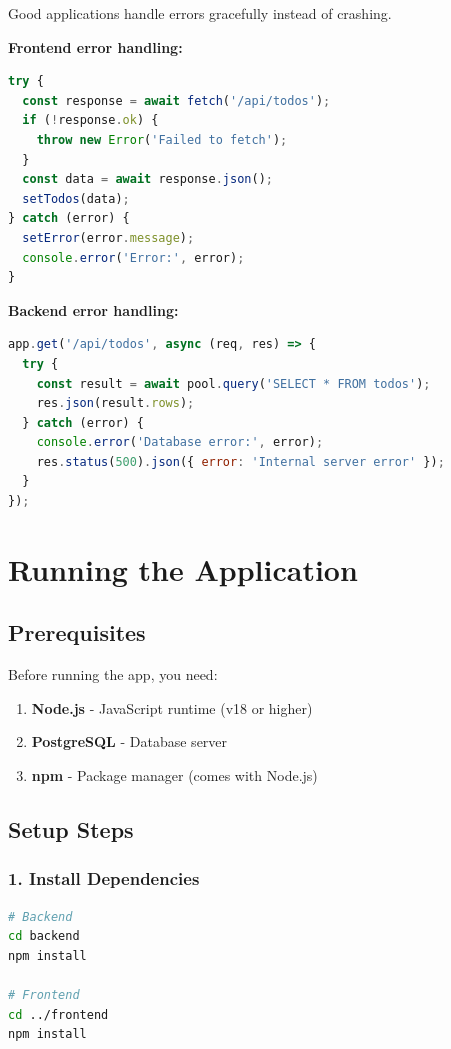 \documentclass[12pt,a4paper]{article}
\begin{document}
Good applications handle errors gracefully instead of crashing.

\textbf{Frontend error handling:}
\begin{lstlisting}[language=JavaScript]
try {
  const response = await fetch('/api/todos');
  if (!response.ok) {
    throw new Error('Failed to fetch');
  }
  const data = await response.json();
  setTodos(data);
} catch (error) {
  setError(error.message);
  console.error('Error:', error);
}
\end{lstlisting}

\textbf{Backend error handling:}
\begin{lstlisting}[language=JavaScript]
app.get('/api/todos', async (req, res) => {
  try {
    const result = await pool.query('SELECT * FROM todos');
    res.json(result.rows);
  } catch (error) {
    console.error('Database error:', error);
    res.status(500).json({ error: 'Internal server error' });
  }
});
\end{lstlisting}

\section{Running the Application}

\subsection{Prerequisites}

Before running the app, you need:
\begin{enumerate}
    \item \textbf{Node.js} - JavaScript runtime (v18 or higher)
    \item \textbf{PostgreSQL} - Database server
    \item \textbf{npm} - Package manager (comes with Node.js)
\end{enumerate}

\subsection{Setup Steps}

\subsubsection{1. Install Dependencies}

\begin{lstlisting}[language=bash]
# Backend
cd backend
npm install

# Frontend
cd ../frontend
npm install
\end{lstlisting}
\end{document}

